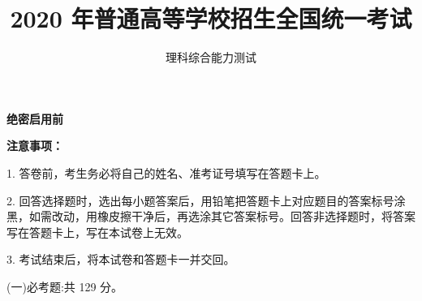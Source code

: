 \documentclass[list,mac]{BHCexam}
\begin{document}
\textbf{绝密启用前} 
\title{2020 年普通高等学校招生全国统一考试}
\subtitle{理科综合能力测试}
\maketitle

\textbf{注意事项：} 
\setlength\parindent{2em}

1. 答卷前，考生务必将自己的姓名、准考证号填写在答题卡上。

2. 回答选择题时，选出每小题答案后，用铅笔把答题卡上对应题目的答案标号涂黑，如需改动，用橡皮擦干净后，再选涂其它答案标号。回答非选择题时，将答案写在答题卡上，写在本试卷上无效。

3. 考试结束后，将本试卷和答题卡一并交回。

\begin{groups}


\begin{questions}[30s]

\end{questions}


\begin{questions}[p]
(一)必考题:共 129 分。

\end{questions}



\end{groups}
\label{lastpage}
\end{document}
